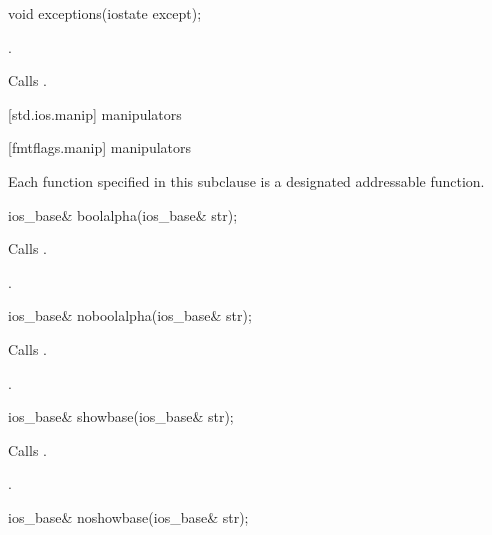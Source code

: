 %
\begin{itemdecl}
void exceptions(iostate except);
\end{itemdecl}

\begin{itemdescr}
\pnum
\ensures
{}.

\pnum
\effects
Calls
.
\end{itemdescr}

[std.ios.manip]{ manipulators}

[fmtflags.manip]{ manipulators}

\pnum
Each function specified in this subclause
is a designated addressable function.

%
\begin{itemdecl}
ios_base& boolalpha(ios_base& str);
\end{itemdecl}

\begin{itemdescr}
\pnum
\effects
Calls
.

\pnum
\returns
{}.
\end{itemdescr}

%
\begin{itemdecl}
ios_base& noboolalpha(ios_base& str);
\end{itemdecl}

\begin{itemdescr}
\pnum
\effects
Calls
.

\pnum
\returns
{}.
\end{itemdescr}

%
\begin{itemdecl}
ios_base& showbase(ios_base& str);
\end{itemdecl}

\begin{itemdescr}
\pnum
\effects
Calls
.

\pnum
\returns
{}.
\end{itemdescr}

%
\begin{itemdecl}
ios_base& noshowbase(ios_base& str);
\end{itemdecl}

